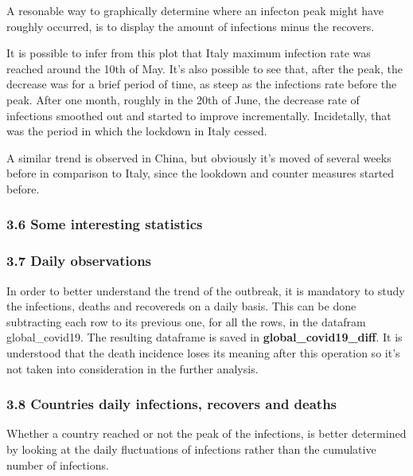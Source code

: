 \documentclass[11pt]{article}
\begin{document}
A resonable way to graphically determine where an infecton peak might
have roughly occurred, is to display the amount of infections minus the
recovers.

It is possible to infer from this plot that Italy maximum infection rate
was reached around the 10th of May. It's also possible to see that,
after the peak, the decrease was for a brief period of time, as steep as
the infections rate before the peak. After one month, roughly in the
20th of June, the decrease rate of infections smoothed out and started
to improve incrementally. Incidetally, that was the period in which the
lockdown in Italy cessed.

A similar trend is observed in China, but obviously it's moved of
several weeks before in comparison to Italy, since the lookdown and
counter measures started before.

\hypertarget{some-interesting-statistics}{%
\subsubsection{3.6 Some interesting
statistics}\label{some-interesting-statistics}}

\hypertarget{daily-observations}{%
\subsubsection{3.7 Daily observations}\label{daily-observations}}

In order to better understand the trend of the outbreak, it is mandatory
to study the infections, deaths and recovereds on a daily basis. This
can be done subtracting each row to its previous one, for all the rows,
in the datafram global\_covid19. The resulting dataframe is saved in
\textbf{global\_covid19\_diff}. It is understood that the death
incidence loses its meaning after this operation so it's not taken into
consideration in the further analysis.

\hypertarget{countries-daily-infections-recovers-and-deaths}{%
\subsubsection{3.8 Countries daily infections, recovers and
deaths}\label{countries-daily-infections-recovers-and-deaths}}

Whether a country reached or not the peak of the infections, is better
determined by looking at the daily fluctuations of infections rather
than the cumulative number of infections.
\end{document}
